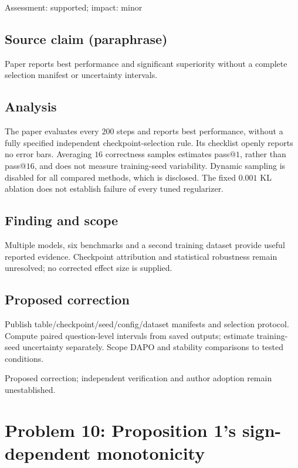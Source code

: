 \documentclass[11pt]{article}
\begin{document}
Assessment: supported; impact: minor

\subsection*{Source claim (paraphrase)}

Paper reports best performance and significant superiority without a complete selection manifest or uncertainty intervals.

\subsection*{Analysis}

The paper evaluates every \(200\) steps and reports best performance, without a fully specified independent checkpoint-selection rule. Its checklist openly reports no error bars. Averaging \(16\) correctness samples estimates pass@\(1\), rather than pass@\(16\), and does not measure training-seed variability. Dynamic sampling is disabled for all compared methods, which is disclosed. The fixed \(0.001\) KL ablation does not establish failure of every tuned regularizer.

\subsection*{Finding and scope}

Multiple models, six benchmarks and a second training dataset provide useful reported evidence. Checkpoint attribution and statistical robustness remain unresolved; no corrected effect size is supplied.

\subsection*{Proposed correction}

Publish table/checkpoint/seed/config/dataset manifests and selection protocol. Compute paired question-level intervals from saved outputs; estimate training-seed uncertainty separately. Scope DAPO and stability comparisons to tested conditions.

Proposed correction; independent verification and author adoption remain unestablished.

\section*{Problem 10: Proposition 1's sign-dependent monotonicity}
\end{document}
